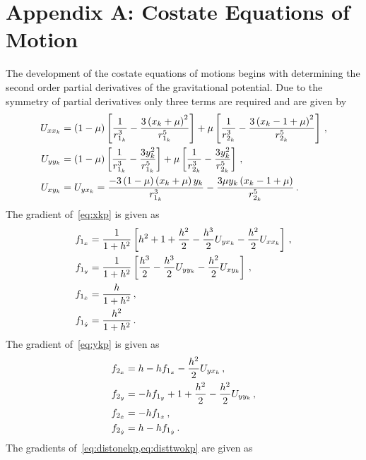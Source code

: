 \documentclass[preprint]{elsarticle}
\begin{document}
\section*{Appendix A: Costate Equations of Motion}\label{sec:costate_appendix}
The development of the costate equations of motions begins with determining the second order partial derivatives of the gravitational potential. 
Due to the symmetry of partial derivatives only three terms are required and are given by
\begin{align}\label{eq:second_discrete_potential_grad}
	U_{xx_k} &= \left( 1-\mu \right) \left[ \frac{1}{r_{1_k}^3} - \frac{3 \left( x_k +\mu \right)^2}{r_{1_k}^5} \right] + \mu \left[ \frac{1}{r_{2_{k}}^3} - \frac{3 \left( x_k -1 + \mu \right)^2}{r_{2_{k}}^5} \right] \, ,\\
	U_{yy_{k}} &= \left( 1-\mu \right) \left[ \frac{1}{r_{1_k}^3} - \frac{3 y_{k}^2}{r_{1_k}^5} \right] + \mu \left[ \frac{1}{r_{2_{k}}^3} - \frac{3 y_{k}^2}{r_{2_{k}}^5} \right] \, ,\\
	U_{xy_{k}} &= U_{yx_k} =  \frac{-3 \left( 1-\mu \right) \left( x_k +\mu \right) y_{k}}{r_{1_k}^3} - \frac{3\mu y_{k}\left( x_k-1+\mu \right)}{r_{2_{k}}^5} \, .
\end{align}
The gradient of~\cref{eq:xkp} is given as
\begin{subequations}\label{eq:xkp_grad}
\begin{align}
	f_{1_x} &= \frac{1}{1+h^2} \left[ h^2 + 1 + \frac{h^2}{2} -\frac{h^3}{2} U_{yx_k} - \frac{h^2}{2}U_{xx_k} \right] \, ,\\
	f_{1_y} &= \frac{1}{1+h^2} \left[  \frac{h^3}{2} -\frac{h^3}{2} U_{yy_{k}} - \frac{h^2}{2}U_{xy_{k}} \right] \, ,\\
	f_{1_{\dot{x}}} &= \frac{h}{1+h^2} \, ,\\
	f_{1_{\dot{y}}} &= \frac{h^2}{1+h^2} \, .
\end{align}
\end{subequations}
The gradient of~\cref{eq:ykp} is given as
\begin{subequations}\label{eq:ykp_grad}
\begin{align}
	f_{2_x} &= h -h f_{1_x} - \frac{h^2}{2} U_{yx_k} \, , \\
	f_{2_y} &= -h f_{1_y} + 1 + \frac{h^2}{2} - \frac{h^2}{2} U_{yy_{k}} \, ,\\
	f_{2_{\dot{x}}} &= -h f_{1_{\dot{x}}} \, ,\\
	f_{2_{\dot{y}}} &= h - h f_{1_{\dot{y}}} \, .
\end{align}
\end{subequations}
The gradients of~\cref{eq:distonekp,eq:disttwokp} are given as
\end{document}
